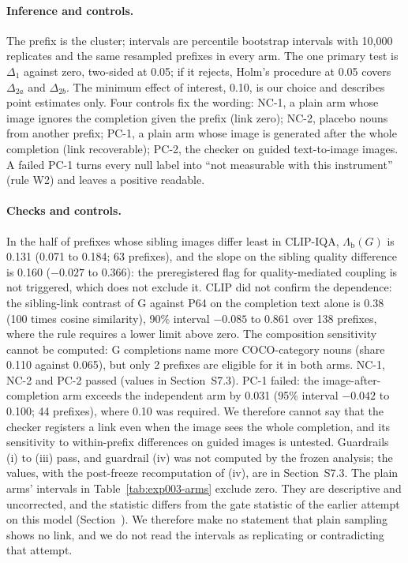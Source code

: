 \documentclass[acmsmall,screen]{acmart}
\makeatletter
\newcommand{\Mref}[1]{\@ifundefined{mr@#1}{\textbf{??}}{\csname mr@#1\endcsname}}
\makeatother
\begin{document}
\paragraph{Inference and controls.}
The prefix is the cluster; intervals are percentile bootstrap intervals with 10,000 replicates and the same resampled prefixes in every arm. The one primary test is $\Delta_1$ against zero, two-sided at 0.05; if it rejects, Holm's procedure at 0.05 covers $\Delta_{2a}$ and $\Delta_{2b}$. The minimum effect of interest, 0.10, is our choice and describes point estimates only. Four controls fix the wording: NC-1, a plain arm whose image ignores the completion given the prefix (link zero); NC-2, placebo nouns from another prefix; PC-1, a plain arm whose image is generated after the whole completion (link recoverable); PC-2, the checker on guided text-to-image images. A failed PC-1 turns every null label into ``not measurable with this instrument'' (rule W2) and leaves a positive readable. %

\paragraph{Checks and controls.}
In the half of prefixes whose sibling images differ least in CLIP-IQA, $\Lambda_{\mathrm b}(G)$ is 0.131 (0.071 to 0.184; 63 prefixes), and the slope on the sibling quality difference is 0.160 ($-0.027$ to 0.366): the preregistered flag for quality-mediated coupling is not triggered, which does not exclude it. CLIP did not confirm the dependence: the sibling-link contrast of G against P64 on the completion text alone is 0.38 (100 times cosine similarity), 90\% interval $-0.085$ to 0.861 over 138 prefixes, where the rule requires a lower limit above zero. The composition sensitivity cannot be computed: G completions name more COCO-category nouns (share 0.110 against 0.065), but only 2 prefixes are eligible for it in both arms. NC-1, NC-2 and PC-2 passed (values in Section~S7.3). PC-1 failed: the image-after-completion arm exceeds the independent arm by 0.031 (95\% interval $-0.042$ to 0.100; 44 prefixes), where 0.10 was required. We therefore cannot say that the checker registers a link even when the image sees the whole completion, and its sensitivity to within-prefix differences on guided images is untested. Guardrails (i) to (iii) pass, and guardrail (iv) was not computed by the frozen analysis; the values, with the post-freeze recomputation of (iv), are in Section~S7.3. The plain arms' intervals in Table~\ref{tab:exp003-arms} exclude zero. They are descriptive and uncorrected, and the statistic differs from the gate statistic of the earlier attempt on this model (Section~\Mref{sec:open-op3}). We therefore make no statement that plain sampling shows no link, and we do not read the intervals as replicating or contradicting that attempt. %
\end{document}
